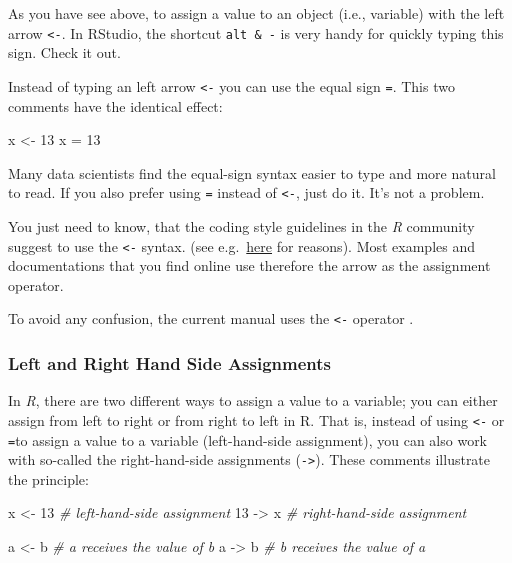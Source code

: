 \documentclass[
]{scrartcl}
\newenvironment{Shaded}{\begin{snugshade}}{\end{snugshade}}
\newcommand{\CommentTok}[1]{\textcolor[rgb]{0.56,0.35,0.01}{\textit{#1}}}
\newcommand{\DecValTok}[1]{\textcolor[rgb]{0.00,0.00,0.81}{#1}}
\newcommand{\NormalTok}[1]{#1}
\newcommand{\OtherTok}[1]{\textcolor[rgb]{0.56,0.35,0.01}{#1}}
\begin{document}
As you have see above, to assign a value to an object (i.e., variable) with the left arrow \texttt{\textless{}-}. In RStudio, the shortcut \texttt{alt\ \&\ -} is very handy for quickly typing this sign. Check it out.

Instead of typing an left arrow \texttt{\textless{}-} you can use the equal sign \texttt{=}. This two comments have the identical effect:

\begin{Shaded}
\begin{Highlighting}[]
\NormalTok{x }\OtherTok{\textless{}{-}} \DecValTok{13}
\NormalTok{x }\OtherTok{=} \DecValTok{13}
\end{Highlighting}
\end{Shaded}

Many data scientists find the equal-sign syntax easier to type and more natural to read. If you also prefer using \texttt{=} instead of \texttt{\textless{}-}, just do it. It's not a problem.

You just need to know, that the coding style guidelines in the \emph{R} community suggest to use the \texttt{\textless{}-} syntax. (see e.g.~\href{https://www.r-bloggers.com/why-do-we-use-arrow-as-an-assignment-operator/}{here} for reasons). Most examples and documentations that you find online use therefore the arrow as the assignment operator.

To avoid any confusion, the current manual uses the \texttt{\textless{}-} operator .

\hypertarget{left-and-right-hand-side-assignments}{%
\subsubsection{Left and Right Hand Side Assignments}\label{left-and-right-hand-side-assignments}}

In \emph{R}, there are two different ways to assign a value to a variable; you can either assign from left to right or from right to left in R. That is, instead of using \texttt{\textless{}-} or \texttt{=}to assign a value to a variable (left-hand-side assignment), you can also work with so-called the right-hand-side assignments (\texttt{-\textgreater{}}). These comments illustrate the principle:

\begin{Shaded}
\begin{Highlighting}[]
\NormalTok{x }\OtherTok{\textless{}{-}} \DecValTok{13}       \CommentTok{\# left{-}hand{-}side assignment}
\DecValTok{13} \OtherTok{{-}\textgreater{}}\NormalTok{ x       }\CommentTok{\# right{-}hand{-}side assignment}

\NormalTok{a }\OtherTok{\textless{}{-}}\NormalTok{ b        }\CommentTok{\# a receives the value of b}
\NormalTok{a }\OtherTok{{-}\textgreater{}}\NormalTok{ b        }\CommentTok{\# b receives the value of a}
\end{Highlighting}
\end{Shaded}
\end{document}
